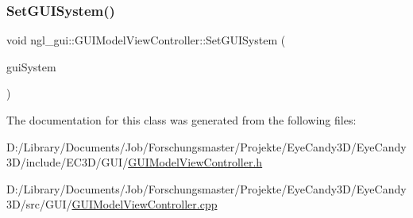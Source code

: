 \mbox{\label{classngl__gui_1_1_g_u_i_model_view_controller_a8f04428e9810125b0fbf14a38a47910d}} 
\subsubsection{\texorpdfstring{Set\+G\+U\+I\+System()}{SetGUISystem()}}
{\footnotesize\ttfamily void ngl\+\_\+gui\+::\+G\+U\+I\+Model\+View\+Controller\+::\+Set\+G\+U\+I\+System (\begin{DoxyParamCaption}\item[{\mbox{\hyperlink{classngl__gui_1_1_g_u_i_system}{G\+U\+I\+System}}}]{gui\+System }\end{DoxyParamCaption})}



The documentation for this class was generated from the following files\+:\begin{DoxyCompactItemize}
\item 
D\+:/\+Library/\+Documents/\+Job/\+Forschungsmaster/\+Projekte/\+Eye\+Candy3\+D/\+Eye\+Candy3\+D/include/\+E\+C3\+D/\+G\+U\+I/\mbox{\hyperlink{_g_u_i_model_view_controller_8h}{G\+U\+I\+Model\+View\+Controller.\+h}}\item 
D\+:/\+Library/\+Documents/\+Job/\+Forschungsmaster/\+Projekte/\+Eye\+Candy3\+D/\+Eye\+Candy3\+D/src/\+G\+U\+I/\mbox{\hyperlink{_g_u_i_model_view_controller_8cpp}{G\+U\+I\+Model\+View\+Controller.\+cpp}}\end{DoxyCompactItemize}
